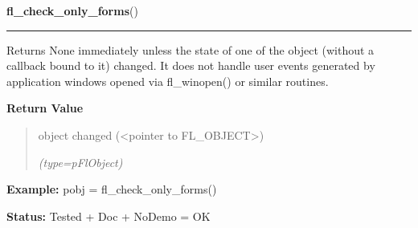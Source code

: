 \hspace{.8\funcindent}\begin{boxedminipage}{\funcwidth}

    \raggedright \textbf{fl\_check\_only\_forms}()

    \vspace{-1.5ex}

    \rule{\textwidth}{0.5\fboxrule}
\setlength{\parskip}{2ex}
    Returns None immediately unless the state of one of the object (without
    a callback bound to it) changed. It does not handle user events 
    generated by application windows opened via fl\_winopen() or similar 
    routines.

\setlength{\parskip}{1ex}
      \textbf{Return Value}
    \vspace{-1ex}

      \begin{quote}
      object changed ({\textless}pointer to FL\_OBJECT{\textgreater})

      {\it (type=pFlObject)}

      \end{quote}

\textbf{Example:} pobj = fl\_check\_only\_forms()



\textbf{Status:} Tested + Doc + NoDemo = OK



    \end{boxedminipage}

    \label{xformslib:flbasic:fl_freeze_form}

    \vspace{0.5ex}

